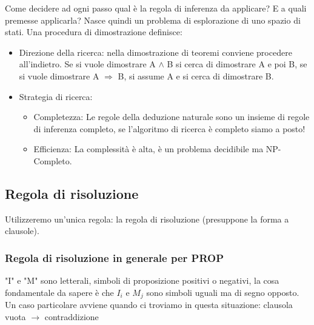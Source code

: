 \documentclass{article}
\begin{document}
Come decidere ad ogni passo qual è la regola di inferenza da applicare? E a quali premesse applicarla? Nasce quindi un problema di esplorazione di uno spazio di stati. \newline 
Una procedura di dimostrazione definisce: 
\begin{itemize}
    \item Direzione della ricerca: nella dimostrazione di teoremi conviene procedere all'indietro. Se si vuole dimostrare A $\land$ B si cerca di dimostrare A e poi B, se si vuole dimostrare A $\Rightarrow$ B, si assume A e si cerca di dimostrare B.
    \item Strategia di ricerca: 
        \begin{itemize}
            \item Completezza: Le regole della deduzione naturale sono un insieme di regole di inferenza completo, se l’algoritmo di ricerca è completo siamo a posto!
            \item Efficienza: La complessità è alta, è un problema decidibile ma NP-Completo.
        \end{itemize}
\end{itemize}

\subsection{Regola di risoluzione}
Utilizzeremo un’unica regola: la regola di risoluzione (presuppone la forma a clausole).\newline
{} \quad 
{}

\subsubsection{Regola di risoluzione in generale per PROP}
\quad
{} \newline
"I" e "M" sono letterali, simboli di proposizione positivi o negativi, la cosa fondamentale da sapere è che $I_i$ e $M_j$ sono simboli uguali ma di segno opposto. \newline
Un caso particolare avviene quando ci troviamo in questa situazione: \newline
{} clausola vuota $\rightarrow$ contraddizione
\end{document}
